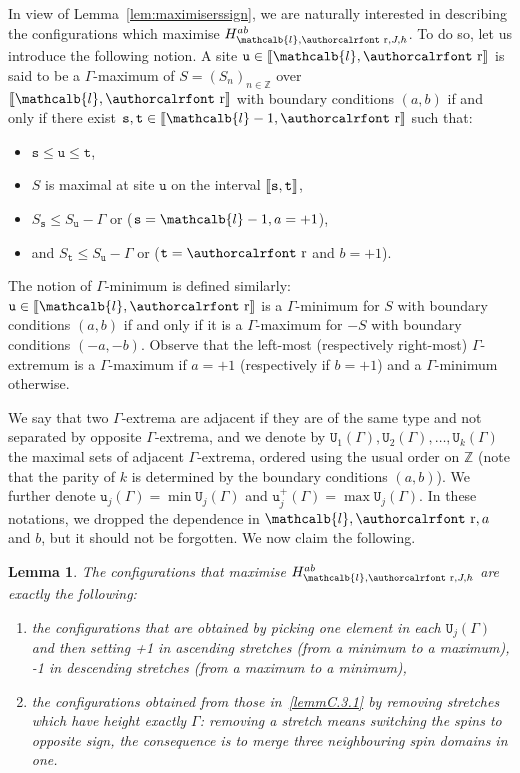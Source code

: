 \documentclass[10pt]{amsart}
\newtheorem{lemm}[theo]{Lemma}\newtheorem{prop}[theo]{Proposition}\newtheorem{coro}[theo]{Corollary}\newtheorem{conj}[theo]{Conjecture}
\theoremstyle{definition}\newtheorem{defi}[theo]{Definition}\newtheorem{rema}[theo]{Remark}\newtheorem{exam}[theo]{Example}\newtheorem{exem}[theo]{Example}\newtheorem{nota}[theo]{Notation}
\newcommand{\mathcalc}[1]{\text{\authorcalrfont #1}}
\newcommand{\Z}{\mathbb{Z}}
\newcommand{\bbZ}{\mathbb{Z}}
\newcommand{\gG}{\Gamma}
\renewcommand*\ss{\mathtt{u}}
\newcommand{\ttt}{\mathtt{t}}
\newcommand{\tu}{\ss}
\newcommand{\tU}{\mathtt{U}}
\newcommand{\ts}{\mathtt{s}}
\renewcommand{\ell}{\mathcalb{l}}
\newcommand{\err}{\mathcalc{r}}
\newcommand{\llbracket}{\mathopen{[\mkern -2.7mu[}}
\newcommand{\rrbracket}{\mathclose{]\mkern -2.7mu]}}
\newcommand{\lbra}{\llbracket}
\newcommand{\rbra}{\rrbracket}
\begin{document}
In view of Lemma~\ref{lem:maximiserssign}, we are naturally interested in describing the configurations which maximise $H_{\ell, \err, J, h}^{ab}$. To do so, let us introduce the following notion. A site $\tu\in\lbra \ell, \err \rbra$ is said to be a $\gG$-maximum of $S=(S_n)_{n\in\bbZ}$ over $\lbra \ell, \err \rbra$ with boundary conditions $(a,b)$ if and only if there exist $\ts, \ttt\in\lbra\ell-1, \err\rbra$ such that:
\begin{itemize}
\item $\ts\le \tu\le \ttt$,
\item $S$ is maximal at site $\tu$ on the interval $\lbra\ts, \ttt\rbra$,
\item $S_{\ts}\le S_{\tu}-\gG$ or ($\ts=\ell-1, a=+1$),
\item and $S_{\ttt}\le S_{\tu}-\gG$ or ($\ttt=\err$ and $b=+1$).
\end{itemize}
The notion of $\gG$-minimum is defined similarly: $\tu\in\lbra \ell, \err \rbra$ is a $\gG$-minimum for $S$ with boundary conditions $(a, b)$ if and only if it is a $\gG$-maximum for $-S$ with boundary conditions $(-a, -b)$. Observe that the left-most (respectively right-most) $\gG$-extremum is a $\gG$-maximum if $a=+1$ (respectively if $b=+1$) and a $\gG$-minimum otherwise.

We say that two $\gG$-extrema are adjacent if they are of the same type and not separated by opposite $\gG$-extrema, and we denote by $\tU_1(\gG), \tU_2(\gG), \dots, \tU_k(\gG)$ the maximal sets of adjacent $\gG$-extrema, ordered using the usual order on $\Z$ (note that the parity of $k$ is determined by the boundary conditions $(a, b)$). We further denote $\tu_j(\gG)=\min \tU_j(\gG)$ and $\tu_j^+(\gG)=\max \tU_j(\gG)$. In these notations, we dropped the dependence in $\ell, \err, a$ and $b$, but it should not be forgotten. We now claim the following.

\begin{lemm}\label{lem:descrmaxim}
The configurations that maximise $H_{\ell, \err, J, h}^{ab}$ are exactly the following:
\begin{enumerate}
\item\label{lemmC.3.1} the configurations that are obtained by picking one element in each $\tU_j(\gG)$ and then setting +1 in ascending stretches (from a minimum to a maximum), -1 in descending stretches (from a maximum to a minimum),
\item\label{lemmC.3.2} the configurations obtained from those in~\eqref{lemmC.3.1} by removing stretches which have height exactly $\gG$: removing a stretch means switching the spins to opposite sign, the consequence is to merge three neighbouring spin domains in one.
\end{enumerate}
\end{lemm}
\end{document}
